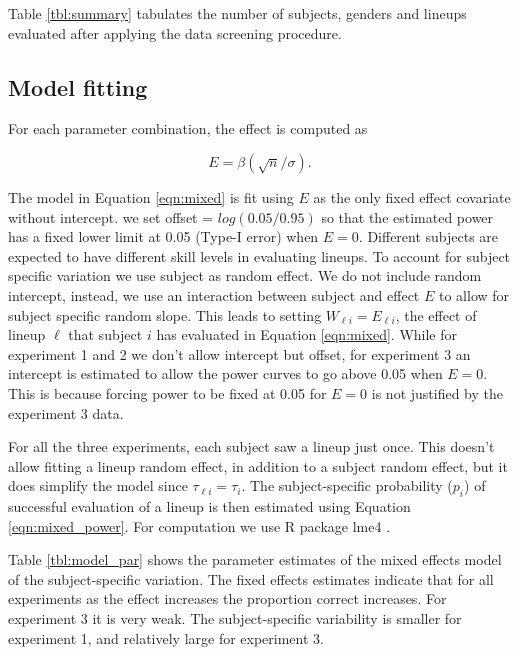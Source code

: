 \documentclass[12pt]{article}
\newcommand{\green}[1]{{\color{green} #1}} %
\begin{document}
Table \ref{tbl:summary} tabulates the number of subjects, genders and lineups evaluated after applying the data screening procedure. 

\subsection{Model fitting}
For each parameter combination, the effect is computed as 

\[
E=\beta (\sqrt {n}/\sigma).
\]

The model in Equation \ref{eqn:mixed} is fit using $E$ as the only fixed effect covariate without intercept. we set offset = $log(0.05/0.95)$ so that the estimated power has a fixed lower limit at 0.05 (Type-I error) when $E=0$. Different subjects are expected to have different skill levels in evaluating lineups. To account for subject specific variation we use subject as random effect. We do not include random intercept, instead, we use an interaction between subject and effect $E$ to allow for subject specific random slope. This leads to setting  $W_{\ell i} = E_{\ell i}$, the effect of lineup $\ell$ that subject $i$ has evaluated in Equation \ref{eqn:mixed}.  While for experiment 1 and 2 we don't allow intercept but offset, for experiment 3 an intercept is estimated to allow the power curves to go above 0.05 when $E=0$. This is because forcing power to be fixed at 0.05 for $E=0$ is not justified by the experiment 3 data.%

For all the three experiments, each subject saw a lineup just once. This doesn't allow fitting a lineup random effect, in addition to a subject random effect, but it does simplify the model since $\tau_{\ell i} = \tau_i$. The subject-specific probability ($p_i$) of successful evaluation of a lineup is then estimated using Equation \ref{eqn:mixed_power}. For computation we use R \citep{R} package lme4 \citep{lme4:2011}.

Table \ref{tbl:model_par} shows the parameter estimates of the mixed effects model of the subject-specific variation. \green{The fixed effects estimates indicate that for all experiments as the effect increases the proportion correct increases. For experiment 3 it is very weak. The subject-specific variability is smaller for experiment 1, and relatively large for experiment 3.} %
\end{document}
